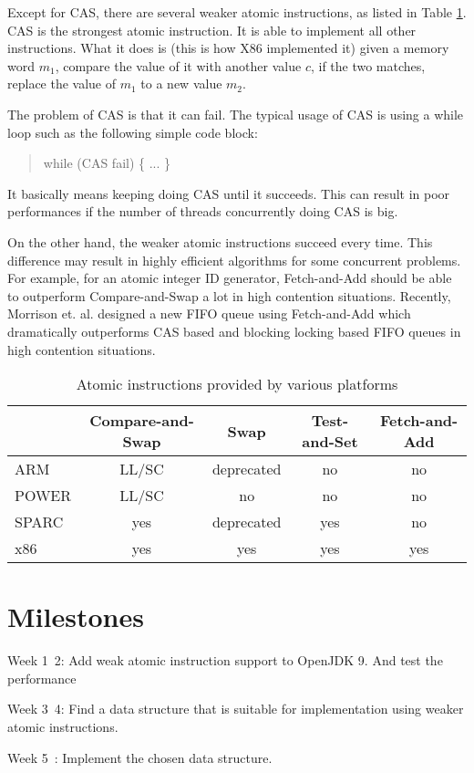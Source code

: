 \documentclass{sig-alternate}
\begin{document}
Except for CAS, there are several weaker atomic instructions, as
listed in Table \ref{table:atomic_instructions}. CAS is the strongest
atomic instruction. It is able to implement all other instructions.
What it does is (this is how X86 implemented it) given a memory word
$m_1$, compare the value of it with another value $c$, if the two
matches, replace the value of $m_1$ to a new value $m_2$. 

The problem of CAS is that it can fail. The typical usage of CAS is
using a while loop such as the following simple code block:

\begin{quote}
  while (CAS fail) \{
    ...
  \} 
\end{quote}

It basically means keeping doing CAS until it succeeds. This can
result in poor performances if the number of threads concurrently
doing CAS is big.

On the other hand, the weaker atomic instructions succeed every time.
This difference may result in highly efficient algorithms for some
concurrent problems. For example, for an atomic integer ID generator,
Fetch-and-Add should be able to outperform Compare-and-Swap a lot
in high contention situations. Recently, Morrison et. al. designed a
new FIFO queue using Fetch-and-Add \cite{Morrison:2013} which
dramatically outperforms CAS based and blocking locking based FIFO
queues in high contention situations.

\begin{table}
  \label{table:atomic_instructions}
  \caption{Atomic instructions provided by various platforms}
  \begin{tabular}{ l || c  c  c  c }\hline
    & Compare-and-Swap & Swap & Test-and-Set & Fetch-and-Add \\ \hline
    ARM & LL/SC & deprecated & no & no \\
    POWER & LL/SC & no & no & no \\
    SPARC & yes & deprecated & yes & no \\
    x86 & yes & yes& yes & yes \\ \hline
    \end{tabular}
\end{table}


\section{Milestones}

Week 1~2: Add weak atomic instruction support to OpenJDK 9. And test
the performance 

Week 3~4: Find a data structure that is suitable for implementation
using weaker atomic instructions. 

Week 5~: Implement the chosen data structure.



\end{document}
